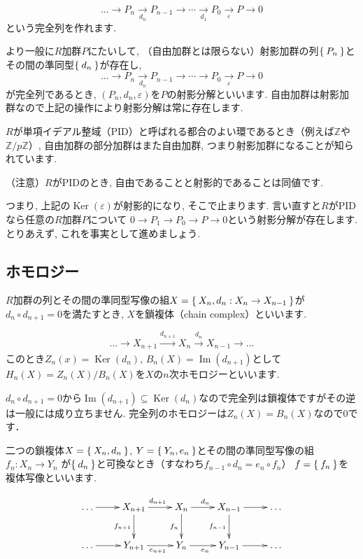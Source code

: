 \documentclass{jsarticle}
\newcommand{\ZZ}{\mathbb{Z}}
\newcommand{\makeop}[1]{\mathop{\mathrm{#1}}\nolimits}
\def\Im{\makeop{Im}}
\def\Ker{\makeop{Ker}}
\theoremstyle{definition}
\numberwithin{theorem}{section}
\begin{document}
\[
\ldots \rightarrow P_n \xrightarrow[d_n]{} P_{n-1} \rightarrow \cdots \xrightarrow[d_1]{} P_0 \xrightarrow[\varepsilon]{} P \rightarrow 0
\]
という完全列を作れます.

より一般に$R$加群$P$にたいして, （自由加群とは限らない）射影加群の列$\Set{P_n}$とその間の準同型$\Set{d_n}$が存在し,
\[
\ldots \rightarrow P_n \xrightarrow[d_n]{} P_{n-1} \rightarrow \cdots \rightarrow P_0 \xrightarrow[\varepsilon]{} P \rightarrow 0
\]
が完全列であるとき, $(P_n, d_n, \varepsilon)$を$P$の射影分解といいます. 自由加群は射影加群なので上記の操作により射影分解は常に存在します.

$R$が単項イデアル整域（PID）と呼ばれる都合のよい環であるとき（例えば$\ZZ$や$\ZZ/p\ZZ$）, 自由加群の部分加群はまた自由加群, つまり射影加群になることが知られています.

（注意）$R$がPIDのとき, 自由であることと射影的であることは同値です.

つまり, 上記の$\Ker(\varepsilon)$が射影的になり, そこで止まります. 言い直すと$R$がPIDなら任意の$R$加群$P$について
$0\rightarrow P_1 \rightarrow P_0 \rightarrow P \rightarrow 0$という射影分解が存在します. とりあえず, これを事実として進めましょう.

\subsection{ホモロジー}
$R$加群の列とその間の準同型写像の組$X = \Set{X_n, d_n:X_n\rightarrow X_{n-1}}$が$d_n \circ d_{n+1} = 0$を満たすとき, $X$を鎖複体（chain complex）といいます.

\[
\ldots \rightarrow X_{n+1} \xrightarrow[]{d_{n+1}} X_{n} \xrightarrow[]{d_{n}} X_{n-1} \rightarrow \ldots
\]
このとき$Z_n(x) = \Ker(d_n)$, $B_n(X) = \Im(d_{n+1})$として$H_n(X) = Z_n(X)/B_n(X)$を$X$の$n$次ホモロジーといいます.

$d_n \circ d_{n+1} = 0$から$\Im(d_{n+1})\subseteq \Ker(d_n)$なので完全列は鎖複体ですがその逆は一般には成り立ちません.
完全列のホモロジーは$Z_n(X)=B_n(X)$なので0です．

二つの鎖複体$X = \Set{X_n, d_n}$, $Y = \Set{Y_n, e_n}$とその間の準同型写像の組$f_n:X_n \rightarrow Y_n$
が$\Set{d_n}$と可換なとき（すなわち$f_{n-1}\circ d_n=e_n\circ f_n$） $f = \Set{f_n}$を複体写像といいます.

\begin{equation*}
\xymatrix{
  \ldots \ar[r] & X_{n+1} \ar[r]^{d_{n+1}} \ar[d]_{f_{n+1}} & X_{n} \ar[r]^{d_n} \ar[d]_{f_{n}} & X_{n-1} \ar[r] \ar[d]_{f_{n-1}} & \ldots\\
  \ldots \ar[r] & Y_{n+1} \ar[r]_{e_{n+1}} & Y_{n} \ar[r]_{e_n} & Y_{n-1} \ar[r] & \ldots\\
}
\end{equation*}
\end{document}

